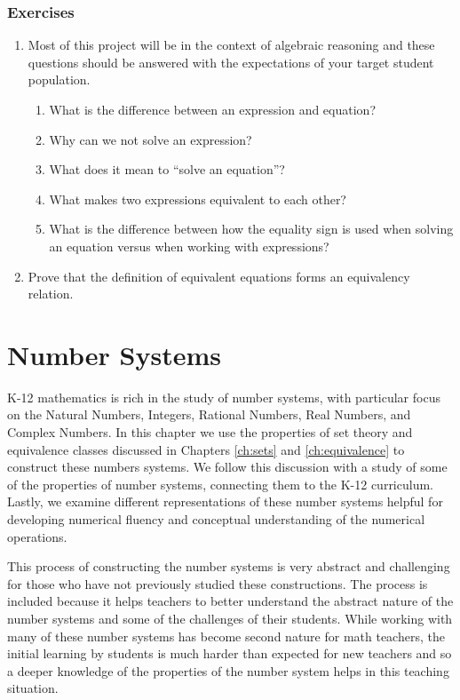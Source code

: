 \documentclass[
]{book}
\providecommand{\tightlist}{%
  \setlength{\itemsep}{0pt}\setlength{\parskip}{0pt}}
\theoremstyle{definition}
\theoremstyle{definition}
\theoremstyle{definition}
\theoremstyle{remark}
\begin{document}
\hypertarget{exercises-9}{%
\subsection{Exercises}\label{exercises-9}}

\begin{enumerate}
\def\labelenumi{\arabic{enumi}.}
\tightlist
\item
  Most of this project will be in the context of algebraic reasoning and these questions should be answered with the expectations of your target student population.

  \begin{enumerate}
  \def\labelenumii{\alph{enumii}.}
  \tightlist
  \item
    What is the difference between an expression and equation?
  \item
    Why can we not solve an expression?
  \item
    What does it mean to ``solve an equation''?
  \item
    What makes two expressions equivalent to each other?
  \item
    What is the difference between how the equality sign is used when solving an equation versus when working with expressions?
  \end{enumerate}
\item
  Prove that the definition of equivalent equations forms an equivalency relation.
\end{enumerate}

\hypertarget{ch:number}{%
\chapter{Number Systems}\label{ch:number}}

K-12 mathematics is rich in the study of number systems, with particular focus on the Natural Numbers, Integers, Rational Numbers, Real Numbers, and Complex Numbers. In this chapter we use the properties of set theory and equivalence classes discussed in Chapters \ref{ch:sets} and \ref{ch:equivalence} to construct these numbers systems. We follow this discussion with a study of some of the properties of number systems, connecting them to the K-12 curriculum. Lastly, we examine different representations of these number systems helpful for developing numerical fluency and conceptual understanding of the numerical operations.

This process of constructing the number systems is very abstract and challenging for those who have not previously studied these constructions. The process is included because it helps teachers to better understand the abstract nature of the number systems and some of the challenges of their students. While working with many of these number systems has become second nature for math teachers, the initial learning by students is much harder than expected for new teachers and so a deeper knowledge of the properties of the number system helps in this teaching situation.
\end{document}

